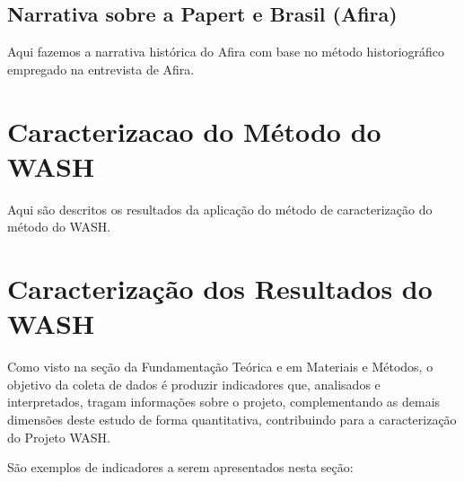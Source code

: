 \documentclass[
12pt,		%
openright,	%
twoside,  %
a4paper,			%
chapter=TITLE,		%
english,			%
french,				%
spanish,			%
brazil				%
]{USPSC-classe/USPSC_RedarTex}
\begin{document}
\subsection[Narrativa sobre a Papert e Brasil (Afira)]{Narrativa sobre a Papert e Brasil (Afira)}\label{Narrativa sobre a Papert e Brasil (Afira)}
Aqui fazemos a narrativa hist\'orica do Afira com base no m\'etodo historiogr\'afico empregado na entrevista de Afira.










\section[Caracterizacao do M\'etodo do WASH]{Caracterizacao do M\'etodo do WASH}\label{Caracterizacao do M\'etodo do WASH}
Aqui s\~ao descritos os resultados da aplica\c{c}\~ao do m\'etodo de caracteriza\c{c}\~ao do m\'etodo do WASH.










\section[Caracteriza\c{c}\~ao dos Resultados do WASH]{Caracteriza\c{c}\~ao dos Resultados do WASH}\label{Caracteriza\c{c}\~ao dos Resultados do WASH}
Como visto na se\c{c}\~ao da Fundamenta\c{c}\~ao Te\'orica e em Materiais e M\'etodos, o objetivo da coleta de dados \'e produzir indicadores que, analisados e interpretados, tragam informa\c{c}\~oes sobre o projeto, complementando as demais dimens\~oes deste estudo de forma quantitativa, contribuindo para a caracteriza\c{c}\~ao do Projeto WASH.










S\~ao exemplos de indicadores a serem apresentados nesta se\c{c}\~ao:
\end{document}
